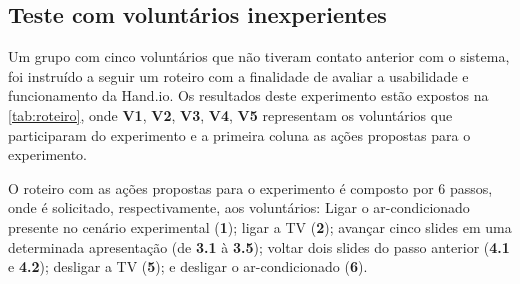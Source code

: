 
\subsection{Teste com voluntários inexperientes}

Um grupo com cinco voluntários que não tiveram contato anterior com o sistema, foi instruído a seguir um roteiro com a finalidade de avaliar a usabilidade e funcionamento da Hand.io. Os resultados deste experimento estão expostos na \autoref{tab:roteiro}, onde \textbf{V1}, \textbf{V2}, \textbf{V3}, \textbf{V4}, \textbf{V5} representam os voluntários que participaram do experimento e a primeira coluna as ações propostas para o experimento. 

O roteiro com as ações propostas para o experimento é composto por $6$ passos, onde é solicitado, respectivamente, aos voluntários: Ligar o ar-condicionado presente no cenário experimental (\textbf{1}); ligar a TV (\textbf{2}); avançar cinco slides em uma determinada apresentação (de \textbf{3.1} à \textbf{3.5}); voltar dois slides do passo anterior (\textbf{4.1} e \textbf{4.2}); desligar a TV (\textbf{5}); e desligar o ar-condicionado (\textbf{6}). 


